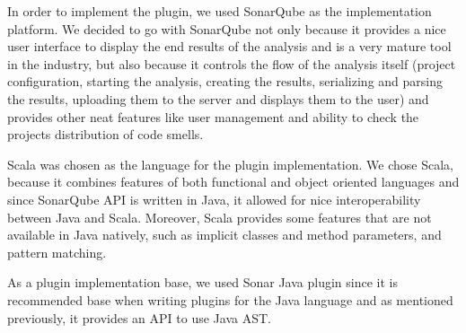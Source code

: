 
In order to implement the plugin, we used SonarQube as the implementation platform.
We decided to go with SonarQube not only because it provides a nice user interface to display the end results of the
analysis and is a very mature tool in the industry, but also because it controls the flow of the analysis itself
(project configuration, starting the analysis, creating the results, serializing and parsing the results, uploading
them to the server and displays them to the user) and provides other neat features like user management and
ability to check the projects distribution of code smells.

Scala was chosen as the language for the plugin implementation.
We chose Scala, because it combines features of both functional and object oriented languages and since SonarQube
API is written in Java, it allowed for nice interoperability between Java and Scala.
Moreover, Scala provides some features that are not available in Java natively, such as implicit classes and
method parameters, and pattern matching.

As a plugin implementation base, we used Sonar Java plugin since it is recommended
base when writing plugins for the Java language and as mentioned previously, it provides
an API to use Java AST\@.

